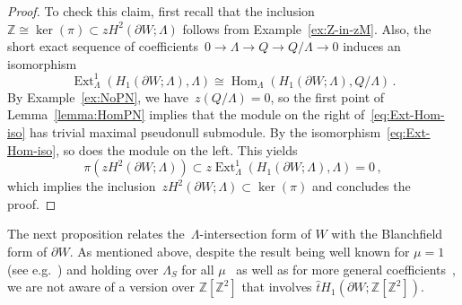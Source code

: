 \documentclass[10.9pt,a4paper]{amsart}
\theoremstyle{definition}
\theoremstyle{remark}
\newcommand{\Z}{\mathbb{Z}}
\newcommand{\Ext}{\operatorname{Ext}}
\newcommand{\Hom}{\operatorname{Hom}}
\newcommand{\that}{\hat{t}}
\begin{document}
\begin{proof}
To check this claim, first recall that the inclusion~$\Z\cong \ker(\pi)\subset zH^2(\partial W;\Lambda)$ follows from Example~\ref{ex:Z-in-zM}.
Also, the short exact sequence of coefficients~$0 \to \Lambda \to Q \to Q/\Lambda \to 0$ induces an
isomorphism
\begin{equation}
\label{eq:Ext-Hom-iso}
\Ext_\Lambda^1(H_1(\partial W;\Lambda),\Lambda) \cong \Hom_\Lambda(H_1(\partial W;\Lambda),Q/\Lambda)\,.
\end{equation}
By Example~\ref{ex:NoPN}, we have~$z(Q/\Lambda)=0$, so the first point of Lemma~\ref{lemma:HomPN}
implies that the module on the right of~\eqref{eq:Ext-Hom-iso} has trivial maximal pseudonull submodule.
By the isomorphism~\eqref{eq:Ext-Hom-iso}, so does the module on the left.
This yields
\[
\pi(zH^2(\partial W;\Lambda))\subset z\Ext_\Lambda^1(H_1(\partial W;\Lambda),\Lambda)=0\,,
\]
which implies the inclusion~$zH^2(\partial W;\Lambda)\subset\ker(\pi)$ and concludes the proof.
\end{proof}

The next proposition relates the~$\Lambda$-intersection form of $W$ with the Blanchfield form of $\partial W$.
As mentioned above,  despite the result being well known for $\mu=1$ (see e.g.~\cite[Theorem 2.6]{BorodzikFriedl}) and holding over $\Lambda_S$ for all $\mu$~\cite{CFT18,ConwayBlanchfield} as well as for more general coefficients~\cite{StirlingThesis},  we are not aware of a version over $\Z[\Z^2]$ that involves $\that H_1(\partial W;\Z[\Z^2])$.
\end{document}
